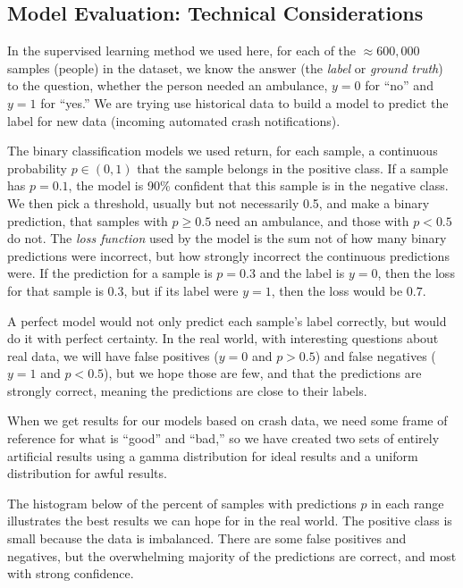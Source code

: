 \subsection{Model Evaluation:  Technical Considerations}


In the supervised learning method we used here, for each of the $\approx 600,000$ samples (people) in the dataset, we know the answer (the {\it label} or {\it ground truth}) to the question, whether the person needed an ambulance, $y=0$ for ``no'' and $y=1$ for ``yes.''  We are trying use historical data to build a model to predict the label for new data (incoming automated crash notifications).

The binary classification models we used return, for each sample, a continuous probability $p \in (0,1)$ that the sample belongs in the positive class.   If a sample has $p = 0.1$, the model is 90\% confident that this sample is in the negative class.   We then pick a threshold, usually but not necessarily 0.5, and make a binary prediction, that samples with $p \ge 0.5$ need an ambulance, and those with $p < 0.5$ do not.  The {\it loss function} used by the model is the sum not of how many binary predictions were incorrect, but how strongly incorrect the continuous predictions were.  If the prediction for a sample is $p = 0.3$ and the label is $y=0$, then the loss for that sample is $0.3$, but if its label were $y=1$, then the loss would be $0.7$.  

A perfect model would not only predict each sample's label correctly, but would do it with perfect certainty.  In the real world, with interesting questions about real data, we will have false positives ($y=0$ and $p>0.5$) and false negatives ($y=1$ and $p<0.5$), but we hope those are few, and that the predictions are strongly correct, meaning the predictions are close to their labels.

When we get results for our models based on crash data, we need some frame of reference for what is ``good'' and ``bad,'' so we have created two sets of entirely artificial results using a gamma distribution for ideal results and a uniform distribution for awful results.  

The histogram below of the percent of samples with predictions $p$ in each range illustrates the best results we can hope for in the real world.  The positive class is small because the data is imbalanced.  There are some false positives and negatives, but the overwhelming majority of the predictions are correct, and most with strong confidence.  

